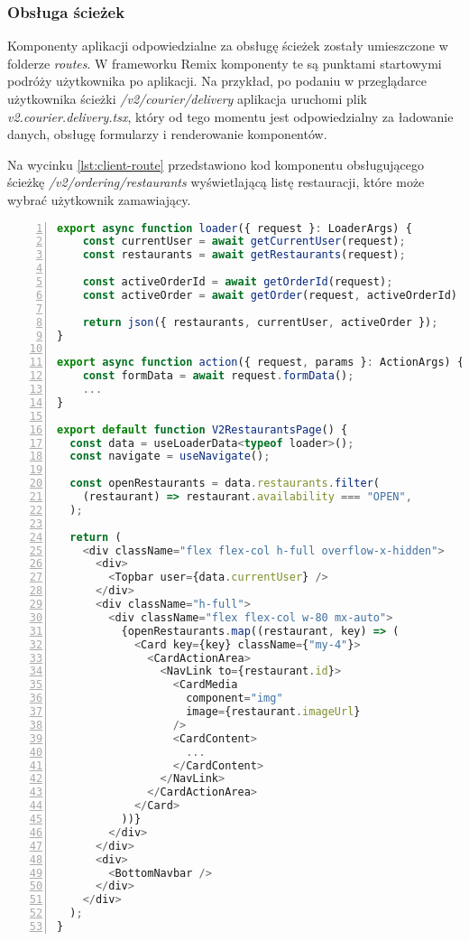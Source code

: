 \subsubsection{Obsługa ścieżek}

Komponenty aplikacji odpowiedzialne za obsługę ścieżek zostały umieszczone w folderze \textit{routes}. W frameworku Remix komponenty te są punktami startowymi podróży użytkownika po aplikacji. Na przykład, po podaniu w przeglądarce użytkownika ścieżki \textit{/v2/courier/delivery} aplikacja uruchomi plik \textit{v2.courier.delivery.tsx}, który od tego momentu jest odpowiedzialny za ładowanie danych, obsługę formularzy i renderowanie komponentów.

Na wycinku \ref{lst:client-route} przedstawiono kod komponentu obsługującego ścieżkę \textit{/v2/ordering/restaurants} wyświetlającą listę restauracji, które może wybrać użytkownik zamawiający.

\begin{lstlisting}[caption={Kod ścieżki wyświetlającej listę dostępnych restauracji - \textit{/v2/ordering/restaurants}},label={lst:client-route},captionpos=b,language=JavaScript,numbers=left,showstringspaces=false]
export async function loader({ request }: LoaderArgs) {
    const currentUser = await getCurrentUser(request);
    const restaurants = await getRestaurants(request);
  
    const activeOrderId = await getOrderId(request);
    const activeOrder = await getOrder(request, activeOrderId)
  
    return json({ restaurants, currentUser, activeOrder });
}

export async function action({ request, params }: ActionArgs) {
    const formData = await request.formData();
    ...
}

export default function V2RestaurantsPage() {
  const data = useLoaderData<typeof loader>();
  const navigate = useNavigate();

  const openRestaurants = data.restaurants.filter(
    (restaurant) => restaurant.availability === "OPEN",
  );

  return (
    <div className="flex flex-col h-full overflow-x-hidden">
      <div>
        <Topbar user={data.currentUser} />
      </div>
      <div className="h-full">
        <div className="flex flex-col w-80 mx-auto">
          {openRestaurants.map((restaurant, key) => (
            <Card key={key} className={"my-4"}>
              <CardActionArea>
                <NavLink to={restaurant.id}>
                  <CardMedia
                    component="img"
                    image={restaurant.imageUrl}
                  />
                  <CardContent>
                    ...
                  </CardContent>
                </NavLink>
              </CardActionArea>
            </Card>
          ))}
        </div>
      </div>
      <div>
        <BottomNavbar />
      </div>
    </div>
  );
}      
\end{lstlisting}
      
